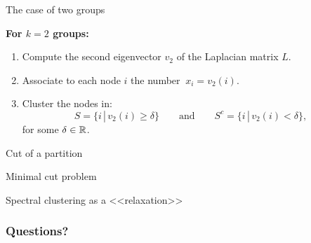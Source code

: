 \documentclass{beamer}
\begin{document}
\begin{frame}[t]{The case of two groups}
	\grid

	\textbf{For $k=2$ groups:}
	\begin{enumerate}
		\item Compute the second eigenvector $v_2$ of the Laplacian matrix $L$.
			\vspace{0.1cm}
		\item Associate to each node $i$ the number $\ x_i = v_{2}(i)$.
			\vspace{0.1cm}
		\item Cluster the nodes in:
			$$
			S = \{ i \, | \, v_2(i) \geq \delta \} \qquad \text{and} \qquad
			S^c = \{ i \, | \, v_2(i) < \delta \},
			$$
			for some $\delta \in \mathbb{R}$.
	\end{enumerate}

\end{frame}

\begin{frame}[t]{Cut of a partition}
	\grid

\end{frame}
\begin{frame}[t]{Minimal cut problem}
	\grid

\end{frame}
\begin{frame}[t]{Spectral clustering as a <<relaxation>>}
	\grid

\end{frame}



\appendix
\backupbegin
\begin{frame}[t]
	\frametitle{Questions?}
	\grid

	\pause
\end{frame}
\backupend
\end{document}
